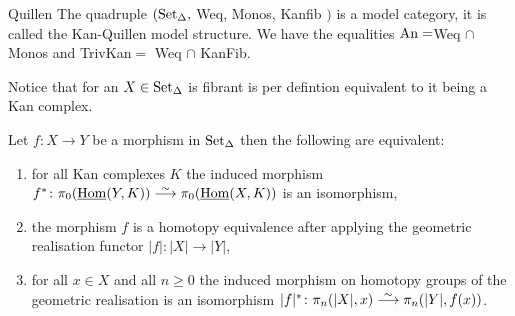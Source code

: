 \begin{thm}{Quillen}
    The quadruple $( \operatorname{Set}_{\Delta} ,$ Weq, Monos, Kanfib $)$ is a model category, it is called the Kan-Quillen model structure.
    We have the equalities $\operatorname{An}=$Weq $\cap$ Monos and TrivKan$=$ Weq $\cap$ KanFib. 
\end{thm}

\begin{rmk}
    Notice that for an $X \in \operatorname{Set}_{\Delta}$ is fibrant is per defintion equivalent to it being a Kan complex.
\end{rmk}

\begin{thm}
    Let $f\colon X  \to Y$ be a morphism in $\operatorname{Set}_{\Delta}$ then the following are equivalent:
    \begin{enumerate}
        \item 
        for all Kan complexes $K$ the induced morphism $f^*\colon \pi_0(\underline{\Hom}(Y,K)) \isomorphism \pi_0(\underline{\Hom}(X,K))$ is an isomorphism,
        \item 
        the morphism $f$ is a homotopy equivalence after applying the geometric realisation functor
        $\lvert f \rvert : \lvert X \rvert \to \lvert Y \rvert$,
        \item 
        for all $x \in X$ and all $n \geq 0$ the induced morphism on homotopy groups of the geometric realisation is an isomorphism $\lvert f \rvert^* \colon  \pi_n(\lvert X \rvert, x) \isomorphism \pi_n(\lvert Y \rvert, f(x))$.
    \end{enumerate}
\end{thm}